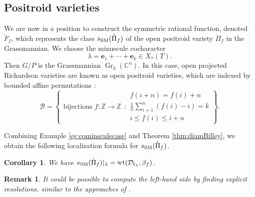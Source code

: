\documentclass[12pt]{amsart}
\newtheorem{Coro}[Th]{Corollary}
\newtheorem{Rmk}[Th]{Remark}
\def\SSM{s_{\rm SM}}
\def\Gr{\operatorname{Gr}}
\def\wt{\operatorname{wt}}
\def\Gr{\operatorname{Gr}}
\begin{document}
\subsection{Positroid varieties}
We are now in a position to  construct  the symmetric rational function, denoted $\tilde{F}_f$, which represents the class  $\SSM(\mathring{\Pi}_f)$ of the open positroid variety $\mathring{\Pi}_f$ in the Grassmannian. 
We choose the minuscule cocharacter
$$\lambda = \mathbf{e}_1+\cdots+\mathbf{e}_k\in X_*(T). $$
Then $G/P$ is the Grassmannian  $\Gr_k(\mathbb{C}^n)$. 
In this case, open projected Richardson varieties  are known as {open positroid varieties}, which are indexed by bounded affine  permutations \cite{KLS-Posi}: 
$$\mathcal{B}
=\left\{
\begin{array}{c}
\text{bijections $f\colon\mathbb{Z}\to \mathbb{Z}$}
\end{array}:
\begin{array}{c}
f(i+n)=f(i)+n\\[1ex]
\frac{1}{n}\sum_{i=1}^n(f(i)-i)=k\\[1ex]
i\leq f(i)\leq i+n
\end{array}
\right\}.$$

Combining %
Example \ref{eg:cominsculecase} and Theorem \ref{thm:diamBilley}, we obtain the following localization formula for $\SSM(\mathring{\Pi}_f)$. 

\begin{Coro}\label{coro:SSMPi=wtD}
We have
$\SSM(\mathring{\Pi}_f)|_{\lambda} =\wt(\mathcal{D}_{t_{\lambda}},\beta_{f})$. 
\end{Coro}
\begin{Rmk}
It could be possible to compute the left-hand side by finding explicit resolutions, similar to the approaches of \cite[Proposition 6.2, Corollary 6.3]{KRW20}.  
\end{Rmk}
\end{document}

